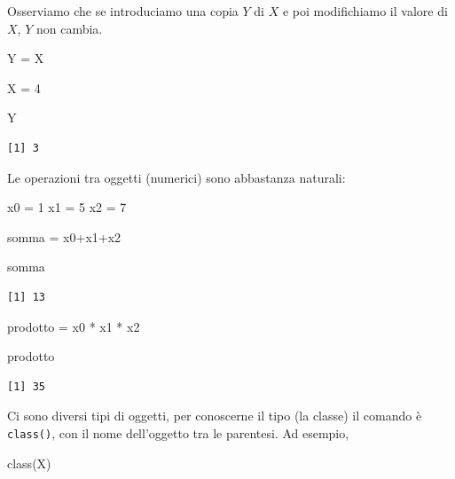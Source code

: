 \documentclass[
  italian,
  letterpaper,
]{book}
\newenvironment{Shaded}{\begin{snugshade}}{\end{snugshade}}
\newcommand{\DecValTok}[1]{\textcolor[rgb]{0.68,0.00,0.00}{#1}}
\newcommand{\FunctionTok}[1]{\textcolor[rgb]{0.28,0.35,0.67}{#1}}
\newcommand{\NormalTok}[1]{\textcolor[rgb]{0.00,0.23,0.31}{#1}}
\newcommand{\OtherTok}[1]{\textcolor[rgb]{0.00,0.23,0.31}{#1}}
\newcommand{\SpecialCharTok}[1]{\textcolor[rgb]{0.37,0.37,0.37}{#1}}
\theoremstyle{definition}
\theoremstyle{remark}
\begin{document}
Osserviamo che se introduciamo una copia \(Y\) di \(X\) e poi
modifichiamo il valore di \(X\), \(Y\) non cambia.

\begin{Shaded}
\begin{Highlighting}[]
\NormalTok{Y }\OtherTok{=}\NormalTok{ X}

\NormalTok{X }\OtherTok{=} \DecValTok{4}

\NormalTok{Y}
\end{Highlighting}
\end{Shaded}

\begin{verbatim}
[1] 3
\end{verbatim}

Le operazioni tra oggetti (numerici) sono abbastanza naturali:

\begin{Shaded}
\begin{Highlighting}[]
\NormalTok{x0 }\OtherTok{=} \DecValTok{1}
\NormalTok{x1 }\OtherTok{=} \DecValTok{5}
\NormalTok{x2 }\OtherTok{=} \DecValTok{7}

\NormalTok{somma }\OtherTok{=}\NormalTok{ x0}\SpecialCharTok{+}\NormalTok{x1}\SpecialCharTok{+}\NormalTok{x2}

\NormalTok{somma}
\end{Highlighting}
\end{Shaded}

\begin{verbatim}
[1] 13
\end{verbatim}

\begin{Shaded}
\begin{Highlighting}[]
\NormalTok{prodotto }\OtherTok{=}\NormalTok{ x0 }\SpecialCharTok{*}\NormalTok{ x1 }\SpecialCharTok{*}\NormalTok{ x2}

\NormalTok{prodotto}
\end{Highlighting}
\end{Shaded}

\begin{verbatim}
[1] 35
\end{verbatim}

Ci sono diversi tipi di oggetti, per conoscerne il tipo (la classe) il
comando è \texttt{class()}, con il nome dell'oggetto tra le parentesi.
Ad esempio,

\begin{Shaded}
\begin{Highlighting}[]
\FunctionTok{class}\NormalTok{(X)}
\end{Highlighting}
\end{Shaded}
\end{document}
